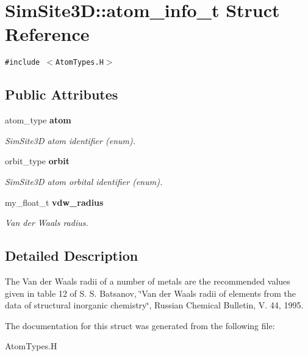 \section{SimSite3D::atom\_\-info\_\-t Struct Reference}
\label{structSimSite3D_1_1atom__info__t}
{\tt \#include $<$Atom\-Types.H$>$}

\subsection*{Public Attributes}
\begin{CompactItemize}
\item 
atom\_\-type \bf{atom}\label{structSimSite3D_1_1atom__info__t_3a8ad1a87e0f8c0e9e20c6b7a3b53e51}

\begin{CompactList}\small\item\em SimSite3D atom identifier (enum). \item\end{CompactList}\item 
orbit\_\-type \bf{orbit}\label{structSimSite3D_1_1atom__info__t_fcebe437b571a4ac9ff7b4dfa319b1d7}

\begin{CompactList}\small\item\em SimSite3D atom orbital identifier (enum). \item\end{CompactList}\item 
my\_\-float\_\-t \bf{vdw\_\-radius}\label{structSimSite3D_1_1atom__info__t_1d6e93f1fc9c78af5bec80786d7560f6}

\begin{CompactList}\small\item\em Van der Waals radius. \item\end{CompactList}\end{CompactItemize}


\subsection{Detailed Description}
The Van der Waals radii of a number of metals are the recommended values given in table 12 of S. S. Batsanov, \char`\"{}Van der Waals radii of elements from the data of structural inorganic chemistry\char`\"{}, Russian Chemical Bulletin, V. 44, 1995. 



The documentation for this struct was generated from the following file:\begin{CompactItemize}
\item 
Atom\-Types.H\end{CompactItemize}
